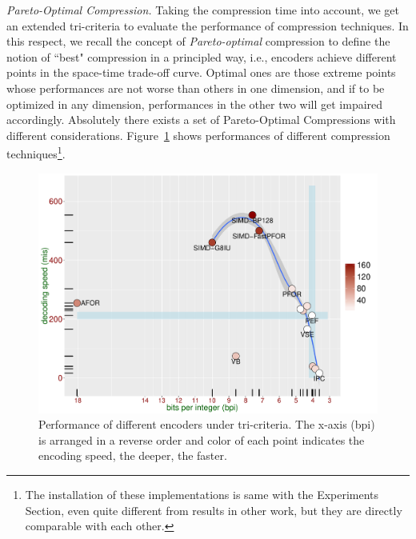 \documentclass[runningheads,a4paper]{llncs}
\begin{document}
\textit{Pareto-Optimal Compression.}
Taking the compression time into account, we get an extended tri-criteria to evaluate the performance of compression techniques.
In this respect, we recall the concept of \textit{Pareto-optimal} compression to define the notion of ``best" compression in a principled way, i.e., encoders achieve different points in the space-time trade-off curve.
Optimal ones are those extreme points whose performances are not worse than others in one dimension, and if to be optimized in any dimension, performances in the other two will get impaired accordingly.
Absolutely there exists a set of Pareto-Optimal Compressions with different considerations.
Figure~\ref{fig:performance} shows performances of different compression techniques\footnote{The installation of these implementations is same with the Experiments Section, even quite different from results in other work, but they are directly comparable with each other.}.

\begin{figure}
	\centering
	\includegraphics[width=0.7\linewidth]{performance}
	\caption{Performance of different encoders under tri-criteria. The x-axis (bpi) is arranged in a reverse order and color of each point indicates the encoding speed, the deeper, the faster.}
	\label{fig:performance}
\end{figure}
\end{document}
